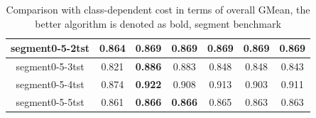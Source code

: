 \documentclass{article}
\begin{document}
\begin{table}[!ht]
\begin{tabular}{|c||c|ccccc|}
segment0-5-2tst           & 0.864                                 & \multicolumn{1}{c|}{\textbf{0.869}} & \multicolumn{1}{c|}{\textbf{0.869}} & \multicolumn{1}{c|}{\textbf{0.869}} & \multicolumn{1}{c|}{\textbf{0.869}} & \textbf{0.869} \\ \hline
segment0-5-3tst           & 0.821                                 & \multicolumn{1}{c|}{\textbf{0.886}} & \multicolumn{1}{c|}{0.883}          & \multicolumn{1}{c|}{0.848}          & \multicolumn{1}{c|}{0.848}          & 0.843          \\ \hline
segment0-5-4tst           & 0.874                                 & \multicolumn{1}{c|}{\textbf{0.922}} & \multicolumn{1}{c|}{0.908}          & \multicolumn{1}{c|}{0.913}          & \multicolumn{1}{c|}{0.903}          & 0.911          \\ \hline
segment0-5-5tst           & 0.861                                 & \multicolumn{1}{c|}{\textbf{0.866}} & \multicolumn{1}{c|}{\textbf{0.866}} & \multicolumn{1}{c|}{0.865}          & \multicolumn{1}{c|}{0.863}          & 0.863          \\ \hline
\end{tabular}
	\label{tab02:overall}
	\caption{Comparison with class-dependent cost in terms of overall GMean, the better algorithm is denoted as bold, segment benchmark}
\end{table}
\end{document}
